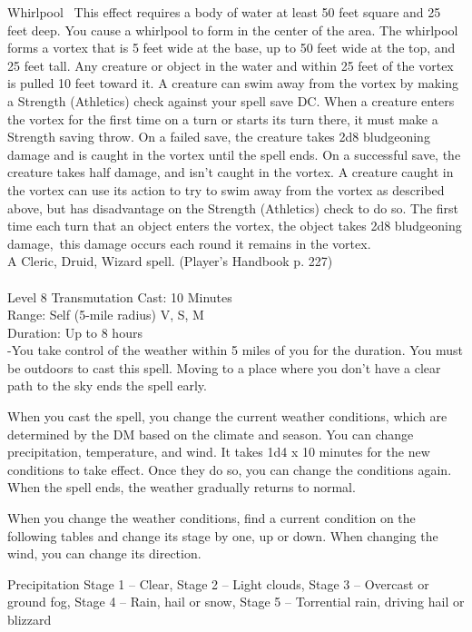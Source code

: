 \documentclass[10pt,twocolumn]{report}
\begin{document}
Whirlpool 
This effect requires a body of water at least 50 feet square and 25 feet deep. You cause a whirlpool to form in the center of the area. The whirlpool forms a vortex that is 5 feet wide at the base, up to 50 feet wide at the top, and 25 feet tall. Any creature or object in the water and within 25 feet of the vortex is pulled 10 feet toward it. A creature can swim away from the vortex by making a Strength (Athletics) check against your spell save DC. 
When a creature enters the vortex for the first time on a turn or starts its turn there, it must make a Strength saving throw. On a failed save, the creature takes 2d8 bludgeoning damage and is caught in the vortex until the spell ends. On a successful save, the creature takes half damage, and isn’t caught in the vortex. A creature caught in the vortex can use its action to try to swim away from the vortex as described above, but has disadvantage on the Strength (Athletics) check to do so. 
The first time each turn that an object enters the vortex, the object takes 2d8 bludgeoning damage, this damage occurs each round it remains in the vortex.\\
A Cleric, Druid, Wizard spell. (Player's Handbook p. 227) \\


 \\
Level 8 \quad Transmutation \quad Cast: 10 Minutes\\
Range: Self (5-mile radius) \quad V, S, M\\
Duration: Up to 8 hours \quad \\
-You take control of the weather within 5 miles of you for the duration. 
You must be outdoors to cast this spell. Moving to a place where you don’t have a clear path to the sky ends the spell early. 

When you cast the spell, you change the current weather conditions, which are determined by the DM based on the climate and season. You can change precipitation, temperature, and wind. It takes 1d4 x 10 minutes for the new conditions to take effect. Once they do so, you can change the conditions again. When the spell ends, the weather gradually returns to normal. 

When you change the weather conditions, find a current condition on the following tables and change its stage by one, up or down. When changing the wind, you can change its direction. 

Precipitation 
Stage 1 – Clear, 
Stage 2 – Light clouds, 
Stage 3 – Overcast or ground fog, 
Stage 4 – Rain, hail or snow, 
Stage 5 – Torrential rain, driving hail or blizzard 
\end{document}

